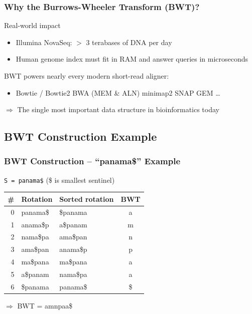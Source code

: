 \documentclass[
11pt, %
aspectratio=169, %
]{beamer}
\begin{document}
\begin{frame}
\frametitle{Why the Burrows-Wheeler Transform (BWT)?}
\begin{block}{Real-world impact}
\begin{itemize}
\item Illumina NovaSeq: $>$ 3 terabases of DNA per day
\item Human genome index must fit in RAM and answer queries in microseconds
\end{itemize}
\end{block}
\bigskip
\alert{BWT powers nearly every modern short-read aligner:}
\begin{itemize}
\item Bowtie / Bowtie2 \quad BWA (MEM \& ALN) \quad minimap2 \quad SNAP \quad GEM \quad \dots
\end{itemize}
$\Rightarrow$ The single most important data structure in bioinformatics today
\end{frame}


\subsection{BWT Construction Example}
\begin{frame}
\frametitle{BWT Construction – ``panama\$'' Example}
\texttt{S = panama\$} \quad (\$ is smallest sentinel)

\begin{center}
\small
\begin{tabular}{r|l|l|c}
\# & Rotation         & Sorted rotation     & BWT \\ \hline
0  & panama\$         & \alert{\$panama}    & \alert{a} \\
1  & anama\$p         & a\$panam            & m \\
2  & nama\$pa         & ama\$pan            & n \\
3  & ama\$pan         & \alert{anama\$p}    & \alert{p} \\
4  & ma\$pana         & ma\$pana            & a \\
5  & a\$panam         & \alert{nama\$pa}    & \alert{a} \\
6  & \$panama         & panama\$            & \$ \\
\end{tabular}
\end{center}
$\Rightarrow$ \alert{BWT = amnpaa\$}
\end{frame}
\end{document}
